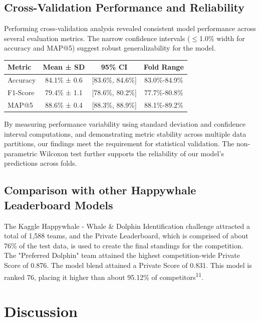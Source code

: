 \documentclass[twocolumn]{article}
\begin{document}
\subsection{Cross-Validation Performance and Reliability}

Performing cross-validation analysis revealed consistent model performance across several evaluation metrics. The narrow confidence intervals (\(\leq\)1.0\% width for accuracy and MAP@5) suggest robust generalizability for the model.

\begin{table}
\begin{tabular}{l c c c}
\hline
\textbf{Metric} & \textbf{Mean ± SD} & \textbf{95\% CI} & \textbf{Fold Range} \\ \hline
Accuracy & 84.1\% ± 0.6 & [83.6\%, 84.6\%] & 83.0\%-84.9\% \\
F1-Score & 79.4\% ± 1.1 & [78.6\%, 80.2\%] & 77.7\%-80.8\% \\
MAP@5 & 88.6\% ± 0.4 & [88.3\%, 88.9\%] & 88.1\%-89.2\% \\ \hline
\end{tabular}
\end{table}

By measuring performance variability using standard deviation and confidence interval computations, and demonstrating metric stability across multiple data partitions, our findings meet the requirement for statistical validation. The non-parametric Wilcoxon test further supports the reliability of our model's predictions across folds. 

\subsection{Comparison with other Happywhale Leaderboard Models}

The Kaggle Happywhale - Whale \& Dolphin Identification challenge attracted a total of 1,588 teams, and the Private Leaderboard, which is comprised of about 76\% of the test data, is used to create the final standings for the competition. The "Preferred Dolphin" team attained the highest competition-wide Private Score of 0.876. The model blend attained a Private Score of 0.831. This model is ranked 76, placing it higher than about 95.12\% of competitors\textsuperscript{11}.

\section{Discussion}
\end{document}
